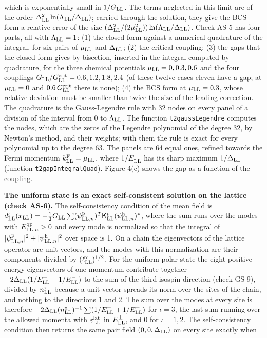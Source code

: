 \documentclass[
  10pt,
]{article}
\begin{document}
which is exponentially small in \(1/G_{\rm LL}\). The terms neglected in
this limit are of the order
\(\Delta_{\rm LL}^2\ln(\Lambda_{\rm LL}/\Delta_{\rm LL})\); carried
through the solution, they give the BCS form a relative error of the
size
\((\Delta_{\rm LL}^2/(2\mu_{\rm LL}^2))\ln(\Lambda_{\rm LL}/\Delta_{\rm LL})\).
Check AS-5 has four parts, all with \(\Lambda_{\rm LL}=1\): (1) the
closed form against a numerical quadrature of the integral, for six
pairs of \(\mu_{\rm LL}\) and \(\Delta_{\rm LL}\); (2) the critical
coupling; (3) the gaps that the closed form gives by bisection, inserted
in the integral computed by quadrature, for the three chemical
potentials \(\mu_{\rm LL}=0,0.3,0.6\) and the four couplings
\(G_{\rm LL}/G^{\rm crit}_{\rm LL}=0.6,1.2,1.8,2.4\) (of these twelve
cases eleven have a gap; at \(\mu_{\rm LL}=0\) and
\(0.6\,G^{\rm crit}_{\rm LL}\) there is none); (4) the BCS form at
\(\mu_{\rm LL}=0.3\), whose relative deviation must be smaller than
twice the size of the leading correction. The quadrature is the
Gauss-Legendre rule with 32 nodes on every panel of a division of the
interval from 0 to \(\Lambda_{\rm LL}\). The function
\texttt{t2gaussLegendre} computes the nodes, which are the zeros of the
Legendre polynomial of the degree 32, by Newton's method, and their
weights; with them the rule is exact for every polynomial up to the
degree 63. The panels are 64 equal ones, refined towards the Fermi
momentum \(k^{\rm F}_{\rm LL}=\mu_{\rm LL}\), where \(1/E^-_{\rm LL}\)
has its sharp maximum \(1/\Delta_{\rm LL}\) (function
\texttt{t2gapIntegralQuad}). Figure 4(c) shows the gap as a function of
the coupling.

\textbf{The uniform state is an exact self-consistent solution on the
lattice (check AS-6).} The self-consistency condition of the mean field
is
\(d^\iota_{\rm LL}(x_{\rm LL})=-\tfrac12G_{\rm LL}\sum(\psi^{\rm p}_{{\rm LL},n})^T\mathsf K^\iota_{\rm LL}(\psi^{\rm h}_{{\rm LL},n})^{*}\),
where the sum runs over the modes with \(E^{\rm qp}_{{\rm LL},n}>0\) and
every mode is normalized so that the integral of
\(\lvert\psi^{\rm p}_{{\rm LL},n}\rvert^2+\lvert\psi^{\rm h}_{{\rm LL},n}\rvert^2\)
over space is 1. On a chain the eigenvectors of the lattice operator are
unit vectors, and the modes with this normalization are their components
divided by \((\ell^{\rm x}_{\rm LL})^{1/2}\). For the uniform polar
state the eight positive-energy eigenvectors of one momentum contribute
together \(-2\Delta_{\rm LL}(1/E^+_{\rm LL}+1/E^-_{\rm LL})\) to the sum
of the third isospin direction (check GS-9), divided by
\(n^{\rm x}_{\rm LL}\) because a unit vector spreads its norm over the
sites of the chain, and nothing to the directions 1 and 2. The sum over
the modes at every site is therefore
\(-2\Delta_{\rm LL}(n^{\rm x}_{\rm LL})^{-1}\sum(1/E^+_{\rm LL}+1/E^-_{\rm LL})\)
for \(\iota=3\), the last sum running over the allowed momenta with
\(\varepsilon^{\rm lat}_{\rm LL}\) in \(E^\pm_{\rm LL}\), and 0 for
\(\iota=1,2\). The self-consistency condition then returns the same pair
field \((0,0,\Delta_{\rm LL})\) on every site exactly when
\end{document}
